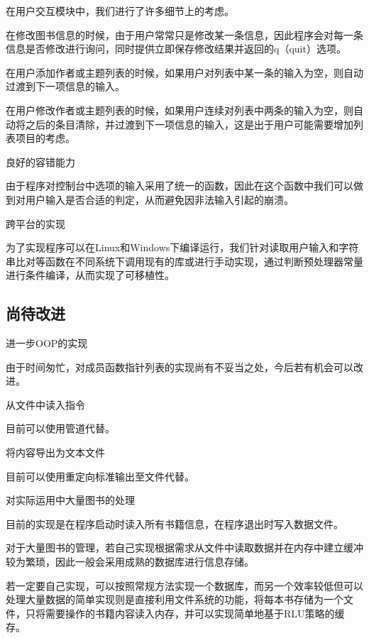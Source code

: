 \begin{DoxyEnumerate}
在用户交互模块中，我们进行了许多细节上的考虑。
\begin{DoxyItemize}
\item 在修改图书信息的时候，由于用户常常只是修改某一条信息，因此程序会对每一条信息是否修改进行询问，同时提供立即保存修改结果并返回的{\ttfamily q}（quit）选项。
\item 在用户添加作者或主题列表的时候，如果用户对列表中某一条的输入为空，则自动过渡到下一项信息的输入。
\item 在用户修改作者或主题列表的时候，如果用户连续对列表中两条的输入为空，则自动将之后的条目清除，并过渡到下一项信息的输入，这是出于用户可能需要增加列表项目的考虑。
\end{DoxyItemize}
\item 良好的容错能力

由于程序对控制台中选项的输入采用了统一的函数，因此在这个函数中我们可以做到对用户输入是否合适的判定，从而避免因非法输入引起的崩溃。
\item 跨平台的实现

为了实现程序可以在{\ttfamily Linux}和{\ttfamily Windows}下编译运行，我们针对读取用户输入和字符串比对等函数在不同系统下调用现有的库或进行手动实现，通过判断预处理器常量进行条件编译，从而实现了可移植性。
\end{DoxyEnumerate}

\subsection*{尚待改进}


\begin{DoxyEnumerate}
\item 进一步{\ttfamily O\-O\-P}的实现

由于时间匆忙，对成员函数指针列表的实现尚有不妥当之处，今后若有机会可以改进。
\item 从文件中读入指令

目前可以使用管道代替。
\item 将内容导出为文本文件

目前可以使用重定向标准输出至文件代替。
\item 对实际运用中大量图书的处理

目前的实现是在程序启动时读入所有书籍信息，在程序退出时写入数据文件。

对于大量图书的管理，若自己实现根据需求从文件中读取数据并在内存中建立缓冲较为繁琐，因此一般会采用成熟的数据库进行信息存储。

若一定要自己实现，可以按照常规方法实现一个数据库，而另一个效率较低但可以处理大量数据的简单实现则是直接利用文件系统的功能，将每本书存储为一个文件，只将需要操作的书籍内容读入内存，并可以实现简单地基于{\ttfamily R\-L\-U}策略的缓存。 
\end{DoxyEnumerate}